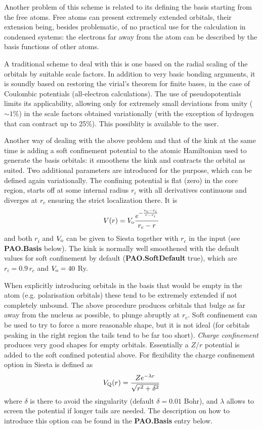 \documentclass[11pt]{article}
\begin{document}
Another problem of this scheme is related to its defining the basis
starting from the free atoms.  Free atoms can present extremely extended
orbitals, their extension being, besides problematic, of no practical
use for the calculation in condensed systems: the electrons far away
from the atom can be described by the basis functions of other atoms.

A traditional scheme to deal with this is one based on the radial
scaling of the orbitals by suitable scale factors.  In addition to
very basic bonding arguments, it is soundly based on restoring
the virial's theorem for finite bases, in the case of Coulombic potentials
(all-electron calculations).  The use of pseudopotentials limits its
applicability, allowing only for extremely small deviations from unity
($\sim 1\%$) in the scale factors obtained variationally (with the
exception of hydrogen that can contract up to 25\%). This possiblity
is available to the user.

Another way of dealing with the above problem and that of the kink at the
same time is adding a soft confinement potential to the atomic
Hamiltonian used to generate the basis orbitals: it smoothens the kink
and contracts the orbital as suited. Two additional parameters are
introduced for the purpose, which can be defined again variationally.
The confining potential is flat (zero) in the core region, starts off
at some internal radius $r_i$ with all derivatives continuous and
diverges at $r_c$ ensuring the strict localization there.  It is
\begin{equation}
  V(r) = V_{\rm o} { e^{- { {r_c - r_i} \over {r - r_i} } } \over {r_c -r} }
\end{equation}
and both $r_i$ and $V_{\rm o}$ can be given to {\sc Siesta} together
with $r_c$ in the input (see {\bf PAO.Basis} below).
The kink is normally well smoothened with the default values 
for soft confinement by default ({\bf PAO.SoftDefault} true), which 
are $r_i = 0.9 \, r_c$ and $V_{\rm o} = 40$ Ry.

When explicitly introducing orbitals in the basis that would be empty in 
the atom (e.g. polarisation orbitals) these tend to be extremely 
extended if not completely unbound. The above procedure produces
orbitals that bulge as far away from the nucleus as possible, to 
plunge abruptly at $r_c$. Soft confinement can be used to try
to force a more reasonable shape, but it is not ideal (for orbitals
peaking in the right region the tails tend to be far too short).
{\it Charge confinement}  produces
very good shapes for empty orbitals. Essentially a $Z/r$ potential
is added to the soft confined potential above. For flexibility
the charge confinement option in {\sc Siesta} is defined as
\begin{equation}
  V_{\rm Q}(r) = {Z e^{-\lambda r} \over \sqrt{r^2 + \delta^2}} 
\end{equation}
where $\delta$ is there to avoid the singularity (default $\delta=0.01$ Bohr),
and $\lambda$ allows to screen the potential if longer tails are needed.
The description on how to introduce this option can be found in
the {\bf PAO.Basis} entry below.
\end{document}
